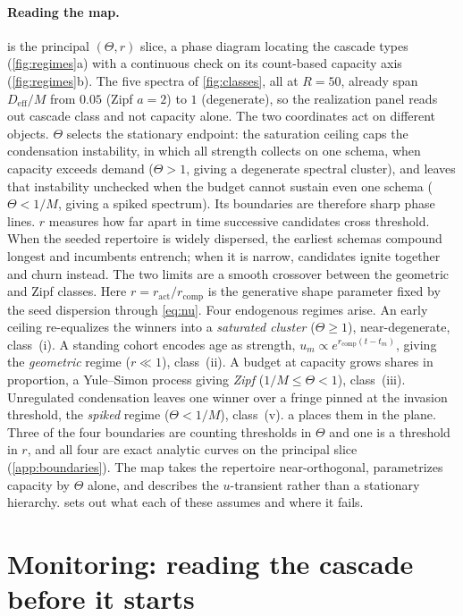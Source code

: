 \documentclass[
  aps,prx,
  reprint,
  superscriptaddress,
  nofootinbib,
  longbibliography
]{revtex4-2}
\newcommand{\ract}{r_{\mathrm{act}}}
\newcommand{\rcomp}{r_{\mathrm{comp}}}
\newcommand{\smref}[1]{\cite[Sec.~#1]{SM}}
\begin{document}
\paragraph{Reading the map.}  is the principal $(\Theta,r)$ slice, a phase diagram locating the cascade types (\cref{fig:regimes}a) with a continuous check on its count-based capacity axis (\cref{fig:regimes}b). The five spectra of \cref{fig:classes}, all at $R=50$, already span $D_{\mathrm{eff}}/M$ from $0.05$ (Zipf $a=2$) to $1$ (degenerate), so the realization panel reads out cascade class and not capacity alone. The two coordinates act on different objects. $\Theta$ selects the stationary endpoint: the saturation ceiling caps the condensation instability, in which all strength collects on one schema, when capacity exceeds demand ($\Theta>1$, giving a degenerate spectral cluster), and leaves that instability unchecked when the budget cannot sustain even one schema ($\Theta<1/M$, giving a spiked spectrum). Its boundaries are therefore sharp phase lines. $r$ measures how far apart in time successive candidates cross threshold. When the seeded repertoire is widely dispersed, the earliest schemas compound longest and incumbents entrench; when it is narrow, candidates ignite together and churn instead. The two limits are a smooth crossover between the geometric and Zipf classes. Here $r=\ract/\rcomp$ is the generative shape parameter fixed by the seed dispersion through \cref{eq:nu}. Four endogenous regimes arise. An early ceiling re-equalizes the winners into a \emph{saturated cluster} ($\Theta\ge1$), near-degenerate, class~(i). A standing cohort encodes age as strength, $u_m\propto e^{\rcomp(t-t_m)}$, giving the \emph{geometric} regime ($r\ll1$), class~(ii). A budget at capacity grows shares in proportion, a Yule--Simon process \cite{simon1955} giving \emph{Zipf} ($1/M\le\Theta<1$), class~(iii). Unregulated condensation leaves one winner over a fringe pinned at the invasion threshold, the \emph{spiked} regime ($\Theta<1/M$), class~(v). a places them in the plane. Three of the four boundaries are counting thresholds in $\Theta$ and one is a threshold in $r$, and all four are exact analytic curves on the principal slice (\cref{app:boundaries}). The map takes the repertoire near-orthogonal, parametrizes capacity by $\Theta$ alone, and describes the $u$-transient rather than a stationary hierarchy. \smref{S7} sets out what each of these assumes and where it fails.

\section{Monitoring: reading the cascade before it starts}\label{sec:monitoring}
\end{document}
